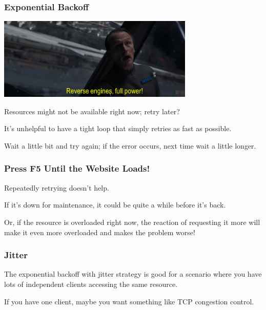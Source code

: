 \begin{frame}
\frametitle{Exponential Backoff}


\begin{center}
	\includegraphics[width=0.7\textwidth]{images/reverse.png}
\end{center}

Resources might not be available right now; retry later?

It's unhelpful to have a tight loop that simply retries as fast as possible. 

Wait a little bit and try again; if the error occurs, next time wait a little longer.

\end{frame}

\begin{frame}
\frametitle{Press F5 Until the Website Loads!}

Repeatedly retrying doesn't help. 

If it's down for maintenance, it could be quite a while before it's back.

Or, if the resource is overloaded right now, the reaction of requesting it more will make it even more overloaded and makes the problem worse! 


\end{frame}

\begin{frame}
\frametitle{Jitter}


The exponential backoff with jitter strategy is good for a scenario where you have lots of independent clients accessing the same resource.

If you have one client, maybe you want something like TCP congestion control.

\end{frame}







